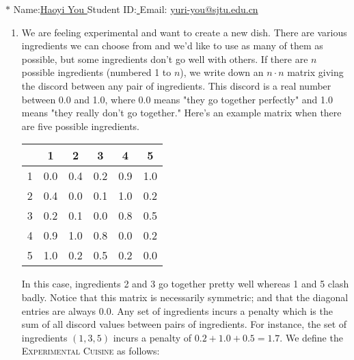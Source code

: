 \documentclass[12pt,a4paper]{article}
\theoremstyle{definition}
\begin{document}
\noindent

\noindent{}
\begin{center}
\footnotesize{\color{blue}$*$ Name:\underline{\quad   Haoyi You  \quad  }\quad Student ID:\underline{ \quad} \quad Email: \underline{\quad yuri-you@sjtu.edu.cn \quad}}
\end{center}

\begin{enumerate}
    \item We are feeling experimental and want to create a new dish. There are various ingredients we can choose from and we'd like to use as many of them as possible, but some ingredients don't go well with others. If there are $n$ possible ingredients (numbered 1 to $n$), we write down an $n\cdot n$ matrix giving the discord between any pair of ingredients. This discord is a real number between 0.0 and 1.0, where 0.0 means "they go together perfectly" and 1.0 means "they really don't go together." Here's an example matrix when there are five possible ingredients.
    \begin{center}
        \begin{tabular}{|c|ccccc|}
        \hline
             & 1  & 2 & 3 & 4 & 5\\
        \hline
            1 & 0.0 & 0.4 & 0.2 & 0.9 & 1.0\\
            2 & 0.4 & 0.0 & 0.1 & 1.0 & 0.2\\
            3 & 0.2 & 0.1 & 0.0 & 0.8 & 0.5\\
            4 & 0.9 & 1.0 & 0.8 & 0.0 & 0.2\\
            5 & 1.0 & 0.2 & 0.5 & 0.2 & 0.0\\
        \hline
        \end{tabular}
    \end{center}
    In this case, ingredients 2 and 3 go together pretty well whereas 1 and 5 clash badly. Notice that this matrix is necessarily symmetric; and that the diagonal entries are always 0.0. Any set of ingredients incurs a penalty which is the sum of all discord values between pairs of ingredients. For instance, the set of ingredients $(1,3,5)$ incurs a penalty of $0.2+1.0+0.5 = 1.7$. We define the \textsc{Experimental Cuisine} as follows:


\end{enumerate}
\end{document}
